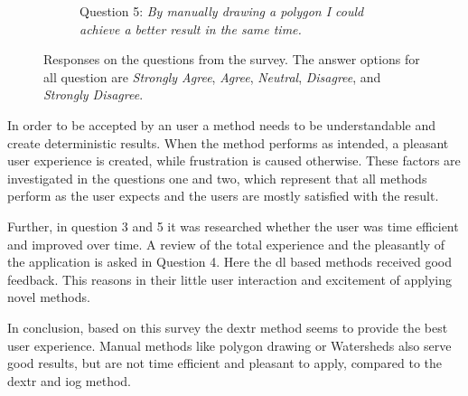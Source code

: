 \begin{figure}
\begin{subfigure}[t]{0.48\textwidth}
		\caption{
			Question 5: \textit{By manually drawing a polygon I could achieve a better result in the same time.}
		} \label{fig:ch5:sec4:q5}
	\end{subfigure}
	\caption [Watershed User Interaction]{
		Responses on the questions from the survey.
		The answer options for all question are \textit{Strongly Agree}, \textit{Agree}, \textit{Neutral}, \textit{Disagree}, and \textit{Strongly Disagree}.
	} \label{fig:ch5:sec4:suvery}
\end{figure}

In order to be accepted by an user a method needs to be understandable and create deterministic results.
When the method performs as intended, a pleasant user experience is created, while frustration is caused otherwise.
These factors are investigated in the questions one and two, which represent that all methods perform as the user expects and the users are mostly satisfied with the result.

Further, in question 3 and 5 it was researched whether the user was time efficient and improved over time.
A review of the total experience and the pleasantly of the application is asked in Question 4.
Here the \gls{dl} based methods received good feedback.
This reasons in their little user interaction and excitement of applying novel methods.

In conclusion, based on this survey the \gls{dextr} method seems to provide the best user experience.
Manual methods like polygon drawing or Watersheds also serve good results, but are not time efficient and pleasant to apply, compared to the \gls{dextr} and \gls{iog} method.  
